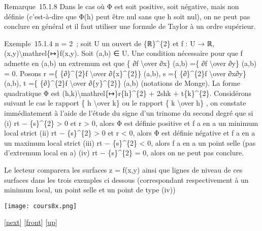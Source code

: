 \documentclass[]{article}
\begin{document}
Remarque~15.1.8 Dans le cas où Φ est soit positive, soit négative, mais
non définie (c'est-à-dire que Φ(h) peut être nul sans que h soit nul),
on ne peut pas conclure en général et il faut utiliser une formule de
Taylor à un ordre supérieur.

Exemple~15.1.4 n = 2~; soit U un ouvert de \{ℝ\}\^{}\{2\} et f : U → ℝ,
(x,y)\textbackslash{}mathrel\{↦\}f(x,y). Soit (a,b) ∈ U. Une condition
nécessaire pour que f admette en (a,b) un extremum est que \{ ∂f
\textbackslash{}over ∂x\} (a,b) =\{ ∂f \textbackslash{}over ∂y\} (a,b) =
0. Posons r =\{ \{∂\}\^{}\{2\}f \textbackslash{}over ∂\{x\}\^{}\{2\}\}
(a,b), s =\{ \{∂\}\^{}\{2\}f \textbackslash{}over ∂x∂y\} (a,b), t =\{
\{∂\}\^{}\{2\}f \textbackslash{}over ∂\{y\}\^{}\{2\}\} (a,b) (notations
de Monge). La forme quadratique Φ est
(h,k)\textbackslash{}mathrel\{↦\}r\{h\}\^{}\{2\} + 2shk +
t\{k\}\^{}\{2\}. Considérons suivant le cas le rapport \{ h
\textbackslash{}over k\} ou le rapport \{ k \textbackslash{}over h\} ,
on constate immédiatement à l'aide de l'étude du signe d'un trinome du
second degré que si (i) rt − \{s\}\^{}\{2\} \textgreater{} 0 et r
\textgreater{} 0, alors Φ est définie positive et f a en a un minimum
local strict (ii) rt − \{s\}\^{}\{2\} \textgreater{} 0 et r \textless{}
0, alors Φ est définie négative et f a en a un maximum local strict
(iii) rt − \{s\}\^{}\{2\} \textless{} 0, alors f a en a un point selle
(pas d'extremum local en a) (iv) rt − \{s\}\^{}\{2\} = 0, alors on ne
peut pas conclure.

Le lecteur comparera les surfaces z = f(x,y) ainsi que lignes de niveau
de ces surfaces dans les trois exemples ci dessous (correspondant
respectivement à un minimum local, un point selle et un point de type
(iv))

\texttt{[image: cours8x.png]}

{[}\href{coursse83.html}{next}{]} {[}\href{coursse82.html}{front}{]}
{[}\href{coursch16.html\#coursse82.html}{up}{]}
\end{document}

